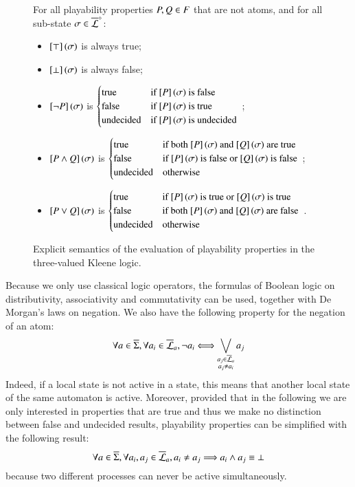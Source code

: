 \begin{figure}[ht]
  For all playability properties $P, Q \in F$ that are not atoms,
  and for all sub-state $\sigma \in \overline{\mathcal{L}}^{\diamond}$:
  \begin{itemize}
    \item $\left[\top\right](\sigma)$ is always true;
    \item $\left[\bot\right](\sigma)$ is always false;
    \item $\left[\neg P\right](\sigma)$ is
      $\begin{cases}
        \text{true} & \text{if $\left[P\right](\sigma)$ is false} \\
        \text{false} & \text{if $\left[P\right](\sigma)$ is true} \\
        \text{undecided} & \text{if $\left[P\right](\sigma)$ is undecided}
      \end{cases}$ \enspace;
    \item $\left[P \wedge Q\right](\sigma)$ is
      $\begin{cases}
        \text{true} & \text{if both $\left[P\right](\sigma)$ and $\left[Q\right](\sigma)$ are true} \\
        \text{false} & \text{if $\left[P\right](\sigma)$ is false or $\left[Q\right](\sigma)$ is false} \\
        \text{undecided} & \text{otherwise}
      \end{cases}$ \enspace;
    \item $\left[P \vee Q\right](\sigma)$ is
      $\begin{cases}
        \text{true} & \text{if $\left[P\right](\sigma)$ is true or $\left[Q\right](\sigma)$ is true} \\
        \text{false} & \text{if both $\left[P\right](\sigma)$ and $\left[Q\right](\sigma)$ are false} \\
        \text{undecided} & \text{otherwise}
      \end{cases}$ \enspace.
  \end{itemize}
  \caption{\label{fig:kleene}%
    Explicit semantics of the evaluation of playability properties in the
    three-valued Kleene logic.
  }
\end{figure}



Because we only use classical logic operators, the formulas of Boolean logic on
distributivity, associativity and commutativity can be used, together with De Morgan's laws on negation.
We also have the following property for the negation of an atom:
\[\forall a \in \overline{\Sigma}, \forall a_i \in \overline{\mathcal{L}}_a,
  \neg a_i \Longleftrightarrow \bigvee_{\substack{a_j \in \overline{\mathcal{L}}_a\\a_j \neq a_i}} a_j\]
Indeed, if a local state is not active in a state, this means that another local state of the same automaton is active.
Moreover,
provided that in the following we are only interested in properties that are true
and thus we make no distinction between false and undecided results,
playability properties can be simplified with the following result:
\[\forall a \in \overline{\Sigma}, \forall a_i, a_j \in \overline{\mathcal{L}}_a,
  a_i \neq a_j \Longrightarrow a_i \wedge a_j \equiv \bot \]
because two different processes can never be active simultaneously.

